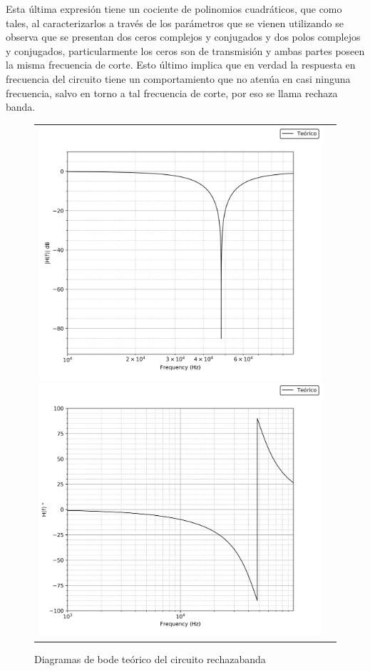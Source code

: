 Esta \'ultima expresi\'on tiene un cociente de polinomios cuadr\'aticos, que como tales, al caracterizarlos a trav\'es de los par\'ametros que se vienen utilizando
se observa que se presentan dos ceros complejos y conjugados y dos polos complejos y conjugados, particularmente los ceros son de transmisi\'on y ambas partes poseen la misma 
frecuencia de corte. Esto \'ultimo implica que en verdad la respuesta en frecuencia del circuito tiene un comportamiento que no aten\'ua en casi ninguna frecuencia, salvo en torno a tal frecuencia
de corte, por eso se llama rechaza banda.

\begin{figure}[H]
    \centering
    \begin{tabular}{c c}
        \includegraphics[scale=0.4]{Recursos/bode_teorico_rechazabanda_modulo.png}
        \includegraphics[scale=0.4]{Recursos/bode_teorico_rechazabanda_fase.png}
    \end{tabular}
    \caption{Diagramas de bode te\'orico del circuito rechazabanda}
    \label{fig:bode_rechazabanda_teorico}
\end{figure}

